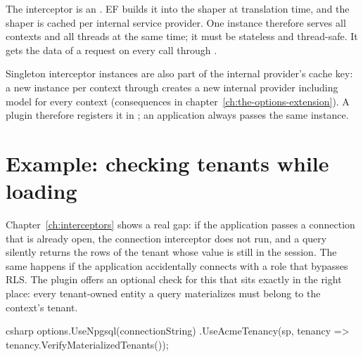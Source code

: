\begin{important}
  The interceptor is an . EF builds it into the
  shaper at translation time, and the shaper is cached per internal service provider. One
  instance therefore serves all contexts and all threads at the same time; it must be
  stateless and thread-safe. It gets the data of a request on every call through
  .

  Singleton interceptor instances are also part of the internal provider's cache key: a new
  instance per context through  creates a new internal
  provider including model for every context (consequences in
  chapter~\ref{ch:the-options-extension}). A plugin therefore registers it in
  ; an application always passes the same instance.
\end{important}

\section{Example: checking tenants while loading}

Chapter~\ref{ch:interceptors} shows a real gap: if the application passes a connection that
is already open, the connection interceptor does not run, and a query silently returns the
rows of the tenant whose value is still in the session. The same happens if the application
accidentally connects with a role that bypasses RLS. The plugin offers an optional check for
this that sits exactly in the right place: every tenant-owned entity a query materializes
must belong to the context's tenant.

\begin{sourcecode}[Application]{csharp}
options.UseNpgsql(connectionString)
       .UseAcmeTenancy(sp, tenancy => tenancy.VerifyMaterializedTenants());
\end{sourcecode}

